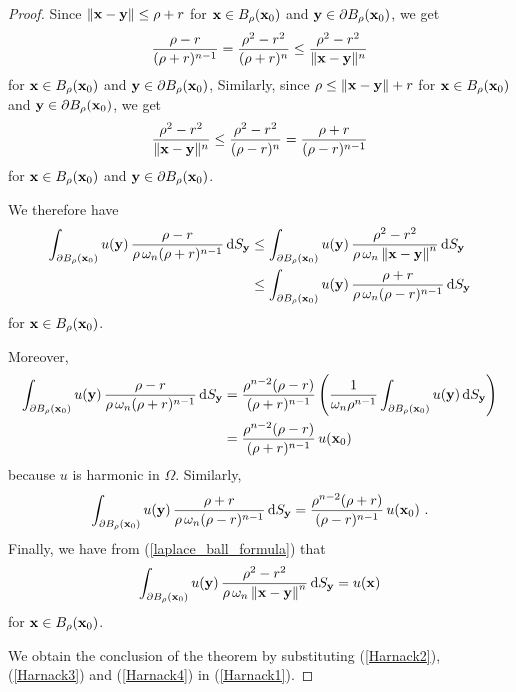 \begin{proof}
Since $\|\mathbf{x} - \mathbf{y}\| \leq \rho + r$ for
$\mathbf{x} \in B_{\rho}(\mathbf{x}_0)$ and
$\mathbf{y} \in \partial B_{\rho}(\mathbf{x}_0)$, we get
\[
\frac{\rho-r}{(\rho+r)^{n-1}} = \frac{\rho^2-r^2}{(\rho+r)^n}
\leq \frac{\rho^2-r^2}{\|\mathbf{x} - \mathbf{y}\|^n}
\]
for
$\mathbf{x} \in B_{\rho}(\mathbf{x}_0)$ and
$\mathbf{y} \in \partial B_{\rho}(\mathbf{x}_0)$, 
Similarly, since $\rho \leq \|\mathbf{x} - \mathbf{y}\| + r$ for
$\mathbf{x} \in B_{\rho}(\mathbf{x}_0)$ and
$\mathbf{y} \in \partial B_{\rho}(\mathbf{x}_0)$, 
we get
\[
\frac{\rho^2-r^2}{\|\mathbf{x} - \mathbf{y}\|^n} \leq
\frac{\rho^2-r^2}{(\rho-r)^n} = \frac{\rho+r}{(\rho-r)^{n-1}}
\]
for
$\mathbf{x} \in B_{\rho}(\mathbf{x}_0)$ and
$\mathbf{y} \in \partial B_{\rho}(\mathbf{x}_0)$.

We therefore have
\begin{equation}\label{Harnack1}
\begin{split}
\int_{\partial B_\rho(\mathbf{x}_0)} u(\mathbf{y})
\, \frac{\rho-r}{\rho\, \omega_n (\rho+r)^{n-1}} \,\mathrm{d}{S}_{\mathbf{y}}
&\leq \int_{\partial B_\rho(\mathbf{x}_0)} u(\mathbf{y})\, 
\frac{\rho^2-r^2}{\rho \, \omega_n \left\|\mathbf{x}-\mathbf{y}\right\|^n}
\,\mathrm{d}{S}_{\mathbf{y}} \\
&\leq \int_{\partial B_\rho(\mathbf{x}_0)} u(\mathbf{y}) \,
\frac{\rho+r}{\rho\, \omega_n (\rho-r)^{n-1}} \,\mathrm{d}{S}_{\mathbf{y}}
\end{split}
\end{equation}
for $\mathbf{x} \in B_{\rho}(\mathbf{x}_0)$.

Moreover,
\begin{equation}\label{Harnack2}
\begin{split}
\int_{\partial B_\rho(\mathbf{x}_0)} u(\mathbf{y})
\, \frac{\rho-r}{\rho\, \omega_n (\rho+r)^{n-1}} \,\mathrm{d}{S}_{\mathbf{y}}
&= \frac{\rho^{n-2}(\rho-r)}{(\rho+r)^{n-1}} \left( \frac{1}{\omega_n \rho^{n-1}}
\int_{\partial B_\rho(\mathbf{x}_0)} u(\mathbf{y}) \,\mathrm{d}{S}_{\mathbf{y}} \right) \\
&= \frac{\rho^{n-2}(\rho-r)}{(\rho+r)^{n-1}}\, u(\mathbf{x}_0)
\end{split}
\end{equation}
because $u$ is harmonic in $\Omega$.  Similarly,
\begin{equation}\label{Harnack3}
\int_{\partial B_\rho(\mathbf{x}_0)} u(\mathbf{y}) \,
\frac{\rho+r}{\rho\, \omega_n (\rho-r)^{n-1}} \,\mathrm{d}{S}_{\mathbf{y}}
= \frac{\rho^{n-2}(\rho+r)}{(\rho-r)^{n-1}}\, u(\mathbf{x}_0) \ .
\end{equation}
Finally, we have from (\ref{laplace_ball_formula}) that
\begin{equation}\label{Harnack4}
\int_{\partial B_\rho(\mathbf{x}_0)} u(\mathbf{y})\, 
\frac{\rho^2-r^2}{\rho \, \omega_n \left\|\mathbf{x}-\mathbf{y}\right\|^n}
\,\mathrm{d}{S}_{\mathbf{y}} = u(\mathbf{x})
\end{equation}
for $\mathbf{x} \in B_{\rho}(\mathbf{x}_0)$.

We obtain the conclusion of the theorem by substituting
(\ref{Harnack2}), (\ref{Harnack3}) and (\ref{Harnack4}) in
(\ref{Harnack1}).
\end{proof}

